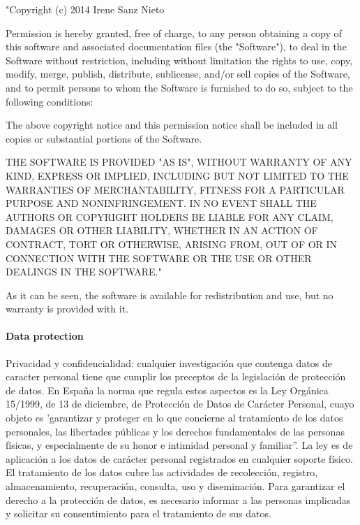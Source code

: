 	"Copyright (c) 2014 Irene Sanz Nieto

Permission is hereby granted, free of charge, to any person obtaining a copy of this software and associated documentation files (the "Software"), to deal in the Software without restriction, including without limitation the rights to use, copy, modify, merge, publish, distribute, sublicense, and/or sell copies of the Software, and to permit persons to whom the Software is furnished to do so, subject to the following conditions:

The above copyright notice and this permission notice shall be included in all copies or substantial portions of the Software.

THE SOFTWARE IS PROVIDED "AS IS", WITHOUT WARRANTY OF ANY KIND, EXPRESS OR IMPLIED, INCLUDING BUT NOT LIMITED TO THE WARRANTIES OF MERCHANTABILITY, FITNESS FOR A PARTICULAR PURPOSE AND NONINFRINGEMENT. IN NO EVENT SHALL THE AUTHORS OR COPYRIGHT HOLDERS BE LIABLE FOR ANY CLAIM, DAMAGES OR OTHER LIABILITY, WHETHER IN AN ACTION OF CONTRACT, TORT OR OTHERWISE, ARISING FROM, OUT OF OR IN CONNECTION WITH THE SOFTWARE OR THE USE OR OTHER DEALINGS IN THE SOFTWARE."

	
	As it can be seen, the software is available for redistribution and use, but no warranty is provided with it. 


	\paragraph{Data protection} 

	Privacidad y confidencialidad: cualquier investigación que contenga datos de caracter personal tiene que cumplir los preceptos de la legislación de protección de datos. En España la norma que regula estos aspectos es la Ley Orgánica 15/1999, de 13 de diciembre, de Protección de Datos de Carácter Personal, cuayo objeto es 'garantizar y proteger en lo que concierne al tratamiento de los datos personales, las libertades públicas y los derechos fundamentales de las personas físicas, y especialmente de su honor e intimidad personal y familiar”.
La ley es de aplicación a los datos de carácter personal registrados en cualquier soporte físico. El tratamiento de los datos cubre las actividades de recolección, registro, almacenamiento, recuperación, consulta, uso y diseminación. Para garantizar el derecho a la protección de datos, es necesario informar a las personas implicadas y solicitar su consentimiento para el tratamiento de sus datos. 